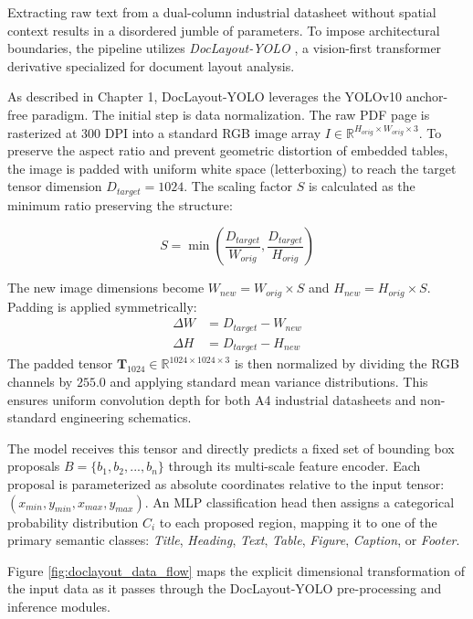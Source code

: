Extracting raw text from a dual-column industrial datasheet without spatial context results in a disordered jumble of parameters. To impose architectural boundaries, the pipeline utilizes \textit{DocLayout-YOLO} \citep{doclayout_yolo}, a vision-first transformer derivative specialized for document layout analysis.

As described in Chapter 1, DocLayout-YOLO leverages the YOLOv10 anchor-free paradigm. The initial step is data normalization. The raw PDF page is rasterized at 300 DPI into a standard RGB image array $I \in \mathbb{R}^{H_{orig} \times W_{orig} \times 3}$. To preserve the aspect ratio and prevent geometric distortion of embedded tables, the image is padded with uniform white space (letterboxing) to reach the target tensor dimension $D_{target} = 1024$. The scaling factor $S$ is calculated as the minimum ratio preserving the structure:

\begin{equation}
S = \min\left(\frac{D_{target}}{W_{orig}}, \frac{D_{target}}{H_{orig}}\right)
\end{equation}

The new image dimensions become $W_{new} = W_{orig} \times S$ and $H_{new} = H_{orig} \times S$. Padding is applied symmetrically:
\begin{align}
\Delta W &= D_{target} - W_{new} \\
\Delta H &= D_{target} - H_{new}
\end{align}
The padded tensor $\mathbf{T}_{1024} \in \mathbb{R}^{1024 \times 1024 \times 3}$ is then normalized by dividing the RGB channels by $255.0$ and applying standard mean variance distributions. This ensures uniform convolution depth for both A4 industrial datasheets and non-standard engineering schematics.

The model receives this tensor and directly predicts a fixed set of bounding box proposals $B = \{b_1, b_2, ..., b_n\}$ through its multi-scale feature encoder. Each proposal is parameterized as absolute coordinates relative to the input tensor: $(x_{min}, y_{min}, x_{max}, y_{max})$. An MLP classification head then assigns a categorical probability distribution $C_i$ to each proposed region, mapping it to one of the primary semantic classes: \textit{Title}, \textit{Heading}, \textit{Text}, \textit{Table}, \textit{Figure}, \textit{Caption}, or \textit{Footer}.

Figure \ref{fig:doclayout_data_flow} maps the explicit dimensional transformation of the input data as it passes through the DocLayout-YOLO pre-processing and inference modules.

